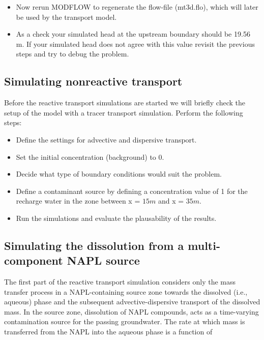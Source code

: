 \begin{itemize}
\item Now rerun MODFLOW to regenerate the flow-file (mt3d.flo), which will later be used 
by the transport model.

\item As a check your simulated head at the upstream boundary should be 19.56 m.
If your simulated head does not agree with this value revisit the previous steps 
and try to debug the problem. 

\end{itemize} 

\subsection[Simulating nonreactive transport]{Simulating nonreactive transport}

Before the reactive transport simulations are started we will briefly check
the setup of the model with a tracer transport simulation. 
Perform the following steps:

\begin{itemize} 

\item Define the settings for advective and dispersive transport. 

\item Set the initial concentration (background) to 0.

\item Decide what type of boundary conditions would suit the problem.

\item Define a contaminant source by defining a concentration value of 1 for 
the recharge water in the zone between x = $15 m$ and x = $35 m$.

\item Run the simulations and evaluate the plausability of the results.

\end{itemize}

\subsection[Simulating the dissolution from a multi-component NAPL source]{Simulating the dissolution from a multi-component NAPL source}
 
The first part of the reactive transport simulation considers only the mass transfer 
process in a NAPL-containing source zone towards the dissolved (i.e., aqueous) phase and the 
subsequent advective-dispersive transport of the dissolved mass. 
In the source zone, dissolution of NAPL compounds,
\citep[e.g.,][]{miller_trapped_90} acts as a time-varying contamination source
for the passing groundwater. The rate at which mass is transferred
from the NAPL into the aqueous phase is a function of

